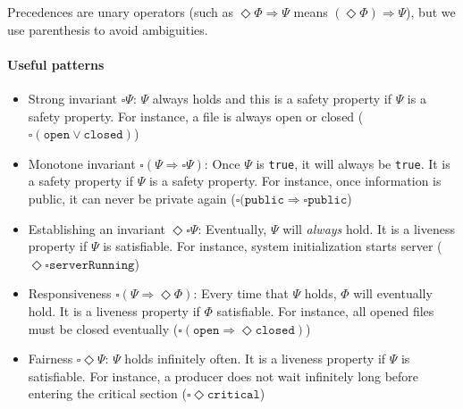 Precedences are unary operators (such as $\Diamond \Phi \Rightarrow \Psi$ means $(\Diamond \Phi) \Rightarrow \Psi$), but we use parenthesis to avoid ambiguities.


\newpage
\paragraph{Useful patterns}
\begin{itemize}
    \item Strong invariant $\square \Psi$: $\Psi$ always holds and this is a safety property if $\Psi$ is a safety property.
          For instance, a file is always open or closed ($\square(\texttt{open} \lor \texttt{closed})$)
    \item Monotone invariant $\square(\Psi \Rightarrow \square \Psi)$: Once $\Psi$ is \texttt{true}, it will always be \texttt{true}.
          It is a safety property if $\Psi$ is a safety property.
          For instance, once information is public, it can never be private again ($\square(\texttt{public} \Rightarrow \square \texttt{public}$)
    \item Establishing an invariant $\Diamond \square \Psi$: Eventually, $\Psi$ will \textit{always} hold. It is a liveness property if $\Psi$ is satisfiable.
          For instance, system initialization starts server ($\Diamond \square \texttt{serverRunning}$)
    \item Responsiveness $\square(\Psi \Rightarrow \Diamond \Phi)$: Every time that $\Psi$ holds, $\Phi$ will eventually hold.
          It is a liveness property if $\Phi$ satisfiable.
          For instance, all opened files must be closed eventually ($\square(\texttt{open} \Rightarrow \Diamond \texttt{closed})$)
    \item Fairness $\square \Diamond \Psi$: $\Psi$ holds infinitely often.
          It is a liveness property if $\Psi$ is satisfiable.
          For instance, a producer does not wait infinitely long before entering the critical section ($\square \Diamond \texttt{critical}$)
\end{itemize}

